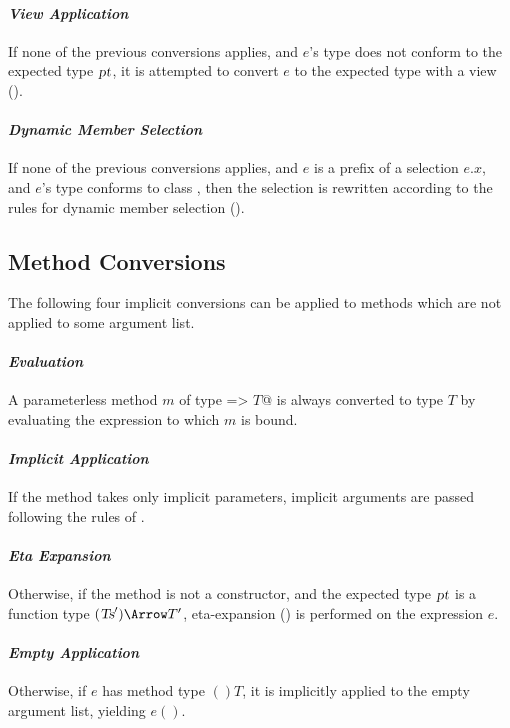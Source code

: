 \paragraph{\em View Application}
If none of the previous conversions applies, and $e$'s type
does not conform to the expected type $\mbox{\sl pt}$, it is attempted to convert
$e$ to the expected type with a view ().\bigskip

\paragraph{\em Dynamic Member Selection}
If none of the previous conversions applies, and $e$ is a prefix
of a selection $e.x$, and $e$'s type conforms to class ,
then the selection is rewritten according to the rules for dynamic
member selection ().

\subsection{Method Conversions}

The following four implicit conversions can be applied to methods
which are not applied to some argument list.

\paragraph{\em Evaluation}
A parameterless method $m$ of type \lstinline@=> $T$@ is always converted to
type $T$ by evaluating the expression to which $m$ is bound.

\paragraph{\em Implicit Application}
  If the method takes only implicit parameters, implicit
  arguments are passed following the rules of .

\paragraph{\em Eta Expansion}
  Otherwise, if the method is not a constructor, 
  and the expected type $\mbox{\sl pt}$ is a function type
  $(\Ts') \Arrow T'$, eta-expansion
  () is performed on the
  expression $e$.

\paragraph{\em Empty Application}
  Otherwise, if $e$ has method type $()T$, it is implicitly applied to the empty
  argument list, yielding $e()$.

